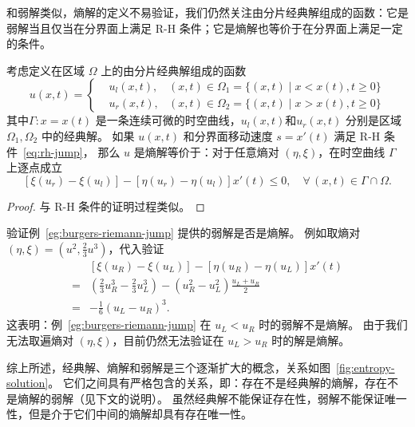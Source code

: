 和弱解类似，熵解的定义不易验证，我们仍然关注由分片经典解组成的函数：它是弱解当且仅当在分界面上满足 R-H 条件；它是熵解也等价于在分界面上满足一定的条件。

\begin{theorem}[分片熵解的刻画]
    考虑定义在区域 $\Omega$ 上的由分片经典解组成的函数
    \[
        u(x,t) =
        \left\{
        \begin{aligned}
             & u_l(x,t), & (x,t) \in \Omega_1 = \{(x,t) \mid x < x(t), t \ge 0\} \\
             & u_r(x,t), & (x,t) \in \Omega_2 = \{(x,t) \mid x > x(t), t \ge 0\}
        \end{aligned}
        \right.
    \]
    其中$\Gamma: x=x(t)$ 是一条连续可微的时空曲线，$u_l(x,t)$和$u_r(x,t)$ 分别是区域 $\Omega_1,\Omega_2$ 中的经典解。
    如果 $u(x,t)$ 和分界面移动速度 $s = x'(t)$ 满足 R-H 条件~\eqref{eq:rh-jump}，
    那么 $u$ 是熵解等价于：对于任意熵对 $(\eta,\xi)$，在时空曲线 $\Gamma$ 上逐点成立
    \begin{equation} \label{eq:entropy-jump}
        \left[\xi(u_r) - \xi(u_l)\right] - \left[\eta(u_r) - \eta(u_l)\right] x'(t) \le 0, \quad \forall\, (x,t) \in \Gamma \cap \Omega.
    \end{equation}
\end{theorem}

\begin{proof}
    与 R-H 条件的证明过程类似。
\end{proof}

\begin{example}
    验证例~\ref{eg:burgers-riemann-jump} 提供的弱解是否是熵解。
    例如取熵对 $(\eta,\xi) = (u^2, \frac23 u^3)$，代入验证
    \begin{align*}
            & \left[\xi(u_R) - \xi(u_L)\right] - \left[\eta(u_R) - \eta(u_L)\right] x'(t)               \\
        ={} & \left(\frac23 u_R^3 - \frac23 u_L^3\right) - \left(u_R^2 - u_L^2\right) \frac{u_L + u_R}2 \\
        ={} & - \frac16 (u_L - u_R)^3.
    \end{align*}
    这表明：例~\ref{eg:burgers-riemann-jump} 在 $u_L < u_R$ 时的弱解不是熵解。
    由于我们无法取遍熵对 $(\eta,\xi)$，目前仍然无法验证在 $u_L > u_R$ 时的解是熵解。
\end{example}

综上所述，经典解、熵解和弱解是三个逐渐扩大的概念，关系如图~\ref{fig:entropy-solution}。
它们之间具有严格包含的关系，即：存在不是经典解的熵解，存在不是熵解的弱解（见下文的说明）。
虽然经典解不能保证存在性，弱解不能保证唯一性，但是介于它们中间的熵解却具有存在唯一性。

